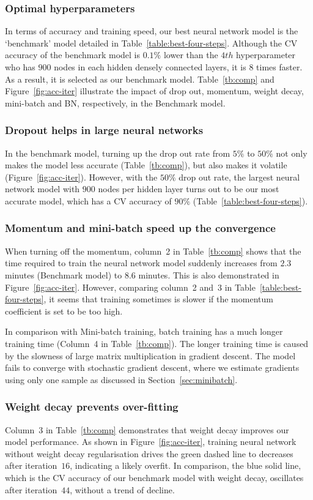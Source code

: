 \subsubsection{Optimal hyperparameters}
In terms of accuracy and training speed, our best neural network model is the `benchmark' model detailed in Table~\ref{table:best-four-steps}. Although the CV accuracy of the benchmark model is $0.1\%$ lower than the $4th$ hyperparameter who has $900$ nodes in each hidden densely connected layers, it is $8$ times faster. As a result, it is selected as our benchmark model. Table~\ref{tb:comp} and Figure~\ref{fig:acc-iter} illustrate the impact of drop out, momentum, weight decay, mini-batch and BN, respectively, in the Benchmark model.

\subsubsection{Dropout helps in large neural networks}
In the benchmark model, turning up the drop out rate from $5\%$ to $50\%$ not only makes the model less accurate (Table~\ref{tb:comp}), but also makes it volatile (Figure~\ref{fig:acc-iter}). However, with the $50\%$ drop out rate, the largest neural network model with $900$ nodes per hidden layer turns out to be our most accurate model, which has a CV accuracy of $90\%$ (Table~\ref{table:best-four-steps}). 

\subsubsection{Momentum and mini-batch speed up the convergence}
When turning off the momentum, column~2 in Table~\ref{tb:comp} shows that the time required to train the neural network model suddenly increases from $2.3$ minutes (Benchmark model) to $8.6$ minutes. This is also demonstrated in Figure~\ref{fig:acc-iter}. However, comparing column~2 and~3 in Table~\ref{table:best-four-steps}, it seems that  training sometimes is slower if the momentum coefficient is set to be too high.

In comparison with Mini-batch training, batch training has a much longer training time  (Column~4 in Table~\ref{tb:comp}). The longer training time is caused by the slowness of large matrix multiplication in gradient descent. The model fails to converge with stochastic gradient descent, where we estimate gradients using only one sample as discussed in Section~\ref{sec:minibatch}.

\subsubsection{Weight decay prevents over-fitting}
Column~3 in Table~\ref{tb:comp} demonstrates that weight decay improves our model performance. As shown in Figure~\ref{fig:acc-iter}, training neural network without weight decay regularisation drives the green dashed line to decreases after iteration~$16$, indicating a likely overfit. In comparison, the blue solid line, which is the CV accuracy of our benchmark model with weight decay, oscillates after iteration~$44$, without a trend of decline.


